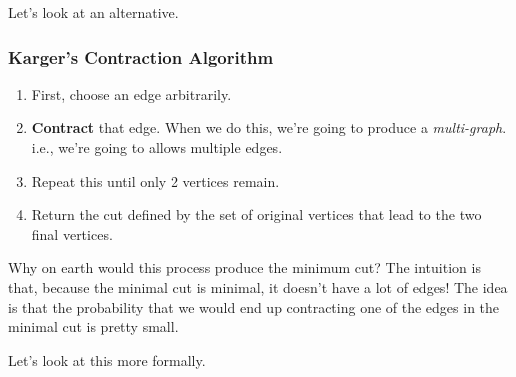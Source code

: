 \documentclass[12pt]{article}
\begin{document}
  Let's look at an alternative.

  \subsubsection{Karger's Contraction Algorithm}

  \begin{enumerate}
    \item First, choose an edge arbitrarily.
    \item {\bf Contract} that edge. When we do this, we're going to produce a
      {\it multi-graph}. i.e., we're going to allows multiple edges.
    \item Repeat this until only 2 vertices remain.
    \item Return the cut defined by the set of original vertices that lead to
      the two final vertices.
  \end{enumerate}



  Why on earth would this process produce the minimum cut? The intuition is
  that, because the minimal cut is minimal, it doesn't have a lot of edges! The
  idea is that the probability that we would end up contracting one of the edges
  in the minimal cut is pretty small.

  Let's look at this more formally.
\end{document}
